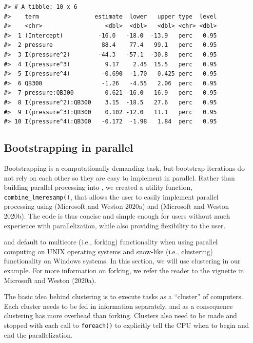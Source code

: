 \begin{verbatim}
#> # A tibble: 10 x 6
#>    term                estimate  lower   upper type  level
#>    <chr>                  <dbl>  <dbl>   <dbl> <chr> <dbl>
#>  1 (Intercept)          -16.0   -18.0  -13.9   perc   0.95
#>  2 pressure              88.4    77.4   99.1   perc   0.95
#>  3 I(pressure^2)        -44.3   -57.1  -30.8   perc   0.95
#>  4 I(pressure^3)          9.17    2.45  15.5   perc   0.95
#>  5 I(pressure^4)         -0.690  -1.70   0.425 perc   0.95
#>  6 QB300                 -1.26   -4.55   2.06  perc   0.95
#>  7 pressure:QB300         0.621 -16.0   16.9   perc   0.95
#>  8 I(pressure^2):QB300    3.15  -18.5   27.6   perc   0.95
#>  9 I(pressure^3):QB300    0.102 -12.0   11.1   perc   0.95
#> 10 I(pressure^4):QB300   -0.172  -1.98   1.84  perc   0.95
\end{verbatim}

\hypertarget{bootstrapping-in-parallel}{%
\subsection{Bootstrapping in parallel}\label{bootstrapping-in-parallel}}

Bootstrapping is a computationally demanding task, but bootstrap iterations do not rely on each other so they are easy to implement in parallel. Rather than building parallel processing into , we created a utility function, \texttt{combine\_lmeresamp()}, that allows the user to easily implement parallel processing using  (Microsoft and Weston 2020a) and  (Microsoft and Weston 2020b). The code is thus concise and simple enough for users without much experience with parallelization, while also providing flexibility to the user.

 and  default to multicore (i.e., forking) functionality when using parallel computing on UNIX operating systems and snow-like (i.e., clustering) functionality on Windows systems. In this section, we will use clustering in our example. For more information on forking, we refer the reader to the vignette in Microsoft and Weston (2020a).

The basic idea behind clustering is to execute tasks as a ``cluster'' of computers. Each cluster needs to be fed in information separately, and as a consequence clustering has more overhead than forking. Clusters also need to be made and stopped with each call to \texttt{foreach()} to explicitly tell the CPU when to begin and end the parallelization.

